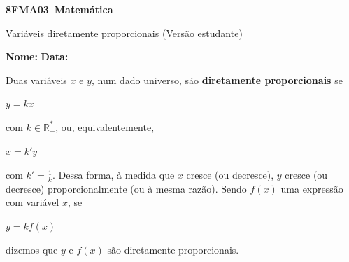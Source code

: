 \documentclass[a4paper,14pt]{article}
\begin{document}
	
	\noindent\textbf{8FMA03~Matemática} 
	
	\begin{center}Variáveis diretamente proporcionais (Versão estudante)
	\end{center}
	
	
	\noindent\textbf{Nome:} \underline{\hspace{10cm}}
	\noindent\textbf{Data:} \underline{\hspace{4cm}}
	
	\begin{multicols}{2}
		Duas variáveis $x$ e $y$, num dado universo, são \textbf{diretamente proporcionais} se 
		\begin{center}
			$y = kx$ \\
		\end{center}
		com $k \in \mathbb{R}_+^*$, ou, equivalentemente,
	    \begin{center}
	    	$x = k'y$ \\
	    \end{center}
	    com $k' = \frac{1}{k}$.
	    Dessa forma, à medida que $x$ cresce (ou decresce), $y$ cresce (ou decresce) proporcionalmente (ou à mesma razão).
	    Sendo $f(x)$ uma expressão com variável $x$, se
	    \begin{center}
	    	$y = kf(x)$
	    \end{center}
	    dizemos que $y$ e $f(x)$ são diretamente proporcionais.
    \end{multicols}

 \noindent\underline{\hspace{18,5cm}}
 
\end{document}
